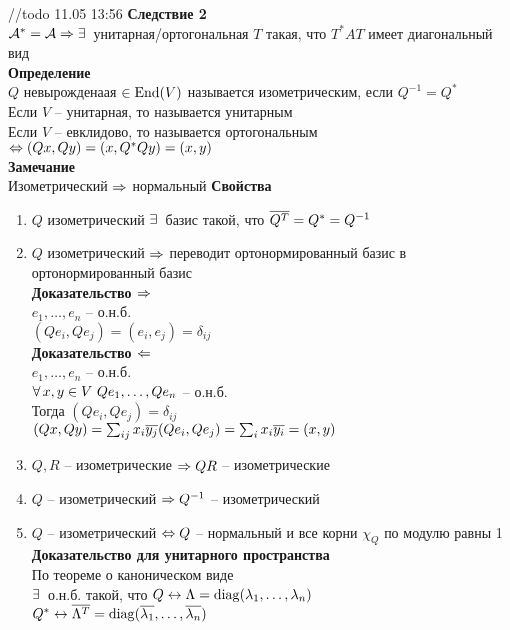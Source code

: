 \documentclass[12pt]{article}
\begin{document}
//todo 11.05 13:56
\textbf{Следствие 2}\\
$\mathcal{A}^* = \mathcal{A} \Rightarrow \exists\,$ унитарная/ортогональная $T$ такая, что $T^*AT$ имеет диагональный вид\\
\textbf{Определение}\\
$Q$ невырожденаая $\in \operatorname{End}(V)$ называется изометрическим, если $Q^{-1} = Q^*$\\
Если $V$ -- унитарная, то называется унитарным\\
Если $V$ -- евклидово, то называется ортогональным\\
$\Leftrightarrow (Qx, Qy) = (x, Q^*Qy) = (x,y)$\\
\textbf{Замечание}\\
Изометрический $\Rightarrow$ нормальный
\textbf{Свойства}
\begin{enumerate}
    \item $Q$ изометрический $\exists\,$ базис такой, что $\overline{Q^T} = Q^* = Q^{-1}$ 
    \item $Q$ изометрический $\Rightarrow$ переводит ортонормированный базис в ортонормированный базис\\
    \textbf{Доказательство $\Rightarrow$}\\
    $e_1, \ldots, e_n$ -- о.н.б.\\
    $(Qe_i, Qe_j) = (e_i, e_j) = \delta_{ij}$\\
    \textbf{Доказательство $\Leftarrow$}\\
    $e_1, \ldots, e_n$ -- о.н.б.\\
    $\forall\, x, y \in V\ Qe_1, \ldots, Qe_n$ -- о.н.б.\\
    Тогда $(Qe_i, Qe_j) = \delta_{ij}$\\
    $(Qx, Qy) = \sum_{ij} x_i \overline{y_j}(Qe_i, Qe_j) = \sum_i x_i \overline{y_i} = (x,y)$
    \item $Q, R$ -- изометрические $\Rightarrow QR$ -- изометрические
    \item $Q$ -- изометрический $\Rightarrow Q^{-1}$ -- изометрический
    \item $Q$ -- изометрический $\Leftrightarrow Q$ -- нормальный и все корни $\chi_Q$ по модулю равны 1\\ 
    \textbf{Доказательство для унитарного пространства}\\
    По теореме о каноническом виде\\
    $\exists\,$ о.н.б. такой, что $Q \leftrightarrow \Lambda = \operatorname{diag}( \lambda_1, \ldots, \lambda_n)$\\
    $Q^* \leftrightarrow \overline{ \Lambda^T} = \operatorname{diag}( \overline{\lambda_1}, \ldots, \overline{ \lambda_n})$\\

\end{enumerate}
\end{document}
